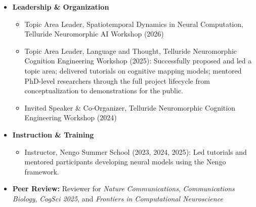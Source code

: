 \documentclass[11pt,a4paper,ragged2e,academicons]{altacv}
\begin{document}
\begin{fullwidth}
\setlength{\columnsep}{0.07cm} %
\begin{itemize}
    \item \textbf{Leadership \& Organization}
\begin{itemize}
\item Topic Area Leader, Spatiotemporal Dynamics in Neural Computation, Telluride Neuromorphic
AI Workshop (2026)
    \item Topic Area Leader, Language and Thought, Telluride Neuromorphic Cognition Engineering Workshop (2025): Successfully proposed and led a topic area; delivered tutorials on cognitive mapping models; mentored PhD-level researchers through the full project lifecycle from conceptualization to demonstrations for the public.
\item Invited Speaker \& Co-Organizer, Telluride Neuromorphic Cognition Engineering Workshop (2024)
\end{itemize}
\item \textbf{Instruction \& Training}
\begin{itemize}
    \item Instructor, Nengo Summer School (2023, 2024, 2025): Led tutorials and mentored participants developing neural models using the Nengo framework.
\end{itemize}
\item \textbf{Peer Review:} Reviewer for \emph{Nature Communications}, \emph{Communications Biology}, \emph{CogSci 2025}, and \emph{Frontiers in Computational Neuroscience} 
\end{itemize}





\end{fullwidth}
\end{document}
